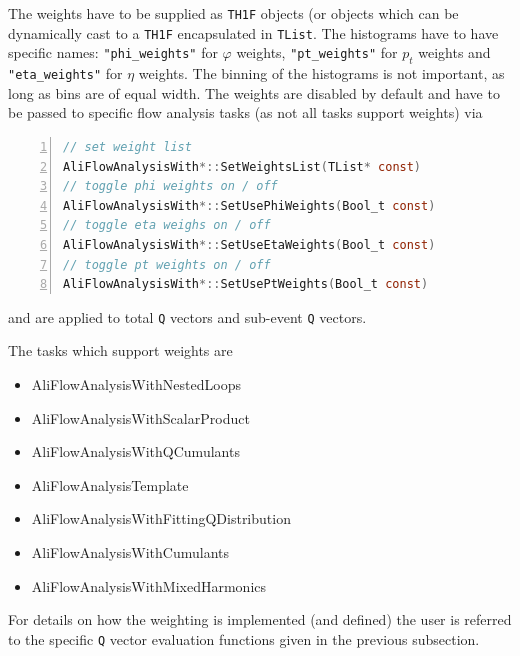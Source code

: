 \documentclass[a4paper]{book}
\numberwithin{equation}{subsection}
\begin{document}
The weights have to be supplied as \texttt{TH1F} objects (or objects which can be dynamically cast to a \texttt{TH1F} encapsulated in \texttt{TList}. The histograms have to have specific names: \texttt{"phi\_weights"} for $\varphi$ weights, \texttt{"pt\_weights"} for $p_t$ weights and \texttt{"eta\_weights"} for $\eta$ weights. The binning of the histograms is not important, as long as bins are of equal width. The weights are disabled by default and have to be passed to specific flow analysis tasks (as not all tasks support weights) via
\begin{lstlisting}[language=C, numbers=left]
// set weight list
AliFlowAnalysisWith*::SetWeightsList(TList* const) 
// toggle phi weights on / off
AliFlowAnalysisWith*::SetUsePhiWeights(Bool_t const)
// toggle eta weighs on / off
AliFlowAnalysisWith*::SetUseEtaWeights(Bool_t const)
// toggle pt weights on / off
AliFlowAnalysisWith*::SetUsePtWeights(Bool_t const)\end{lstlisting}
and are applied to total \texttt{Q} vectors and sub-event \texttt{Q} vectors. 

The tasks which support weights are
\begin{itemize}
\item AliFlowAnalysisWithNestedLoops
\item AliFlowAnalysisWithScalarProduct
\item AliFlowAnalysisWithQCumulants
\item AliFlowAnalysisTemplate
\item AliFlowAnalysisWithFittingQDistribution
\item AliFlowAnalysisWithCumulants
\item AliFlowAnalysisWithMixedHarmonics
\end{itemize}
For details on how the weighting is implemented (and defined) the user is referred to the specific \texttt{Q} vector evaluation functions given in the previous subsection.
\end{document}
